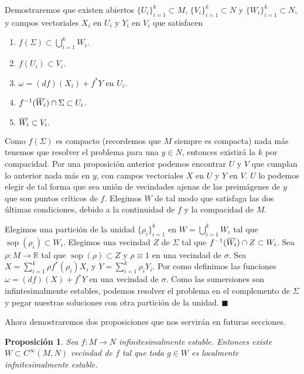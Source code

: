 \documentclass{report}
\newtheorem{prop}[theorem]{Proposici\'on}
\theoremstyle{definition}
\DeclareMathOperator{\sop}{sop}
\newcommand{\overbar}[1]{\mkern 1.5mu\overline{\mkern-1.5mu#1\mkern-1.5mu}\mkern 1.5mu}
\begin{document}
Demostraremos que existen abiertos $\{U_i \}_{i=1}^k \subset M$, $\{ V_i \}_{i=1}^k \subset N$ y $\{ W_i \}_{i=1}^k \subset N$, y campos vectoriales $X_i$ en $U_i$ y $Y_i$ en $V_i$ que satisfacen 
\begin{enumerate}
\item $f(\Sigma) \subset \bigcup\limits_{i=1}^k W_i$.
\item $f(U_i) \subset V_i$.
\item $\omega =  (df)(X_i) + f^\ast Y $ en $U_i$.
\item $f^{-1} (\overbar{W_i}) \cap \Sigma \subset U_i$.
\item $\overbar{W_i} \subset V_i .$
\end{enumerate}

Como $f(\Sigma)$ es compacto (recordemos que $M$ siempre es compacta) nada m\'as tenemos que resolver el problema para una $y \in N$, entonces existir\'a la $k$ por compacidad. Por una proposici\'on anterior podemos encontrar $U$ y $V$ que cumplan lo anterior nada m\'as en $y$, con campos vectoriales $X$ en $U$ y $Y$ en $V$. $U$ lo podemos elegir de tal forma que sea uni\'on de vecindades ajenas de las preim\'agenes  de $y$ que son puntos cr\'iticos de $f$. Elegimos $W$ de tal modo que satisfaga las dos \'ultimas condiciones, debido a la continuidad de $f$ y la compacidad de $M$.

Elegimos una partici\'on de la unidad $\{ \rho_i \}_{i=1}^k$ en $W = \bigcup\limits_{i=1}^k W_i$ tal que $\sop (\rho_i ) \subset W_i$. Elegimos una vecindad $Z$ de $\Sigma$ tal que $f^{-1} (\overbar{W_i}) \cap Z \subset W_i$. Sea $\rho: M \to \mathbb{R}$ tal que $\sop (\rho) \subset Z$ y $\rho \equiv 1$ en una vecindad de $\sigma$. Sea $X = \sum\limits_{i=1}^k \rho f^\ast (\rho_i) X_i$ y $Y = \sum\limits_{i=1}^k \rho_i Y_i$. Por como definimos las funciones $\omega = (df) (X) + f^\ast Y$ en una vecindad de $\sigma$. Como las sumersiones son infintesimalmente estables, podemos resolver el problema en el complemento de $\Sigma$ y pegar nuestras soluciones con otra partici\'on de la unidad. $\blacksquare$

Ahora demostraremos dos proposiciones que nos servir\'an en futuras secciones.

\begin{prop}
Sea $f:M \to N$ infinitesimalmente estable. Entonces existe $W \subset C^\infty (M,N)$ vecindad de $f$ tal que toda $g \in W$ es localmente infnitesimalmente estable.
\end{prop}
\end{document}
